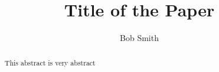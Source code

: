 \documentclass{article}
\title{Title of the Paper}
\author{Bob Smith}
\begin{document}
\maketitle

\begin{abstract}
This abstract is very abstract
\end{abstract}







\end{document}
